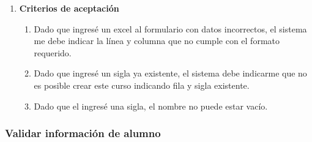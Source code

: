 \begin{enumerate}
\begin{enumerate}
			\item \textbf{Criterios de aceptación}
				\begin{enumerate}
					\item Dado que ingresé un excel al formulario con datos incorrectos, el sistema me debe indicar la línea y columna que no cumple con el formato requerido.
					\item Dado que ingresé un sigla ya existente, el sistema debe indicarme que no es posible crear este curso indicando fila y sigla existente.
					\item Dado que el ingresé una sigla, el nombre no puede estar vacío.
				\end{enumerate}
		\end{enumerate}
\end{enumerate}

\subsubsection{Validar información de alumno}

